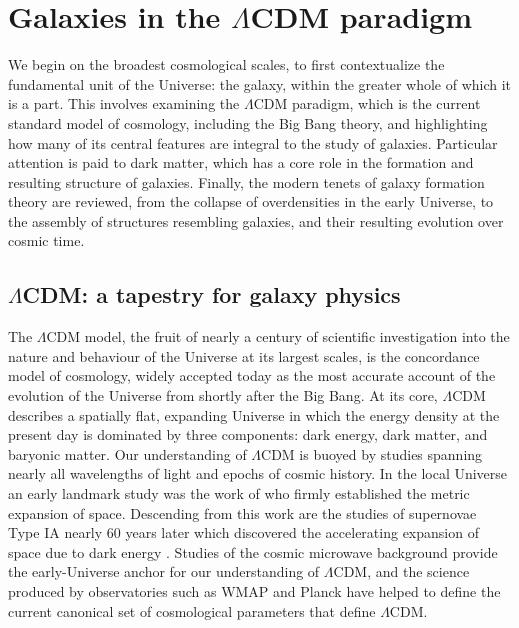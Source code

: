 \section{Galaxies in the \texorpdfstring{$\Lambda$CDM}{LambdaCDM} paradigm}

We begin on the broadest cosmological scales, to first contextualize the fundamental unit of the Universe: the galaxy, within the greater whole of which it is a part. This involves examining the $\Lambda$CDM paradigm, which is the current standard model of cosmology, including the Big Bang theory, and highlighting how many of its central features are integral to the study of galaxies. Particular attention is paid to dark matter, which has a core role in the formation and resulting structure of galaxies. Finally, the modern tenets of galaxy formation theory are reviewed, from the collapse of overdensities in the early Universe, to the assembly of structures resembling galaxies, and their resulting evolution over cosmic time.

\subsection{\texorpdfstring{$\Lambda$CDM}{LambdaCDM}: a tapestry for galaxy physics}

The $\Lambda$CDM model, the fruit of nearly a century of scientific investigation into the nature and behaviour of the Universe at its largest scales, is the concordance model of cosmology, widely accepted today as the most accurate account of the evolution of the Universe from shortly after the Big Bang. At its core, $\Lambda$CDM describes a spatially flat, expanding Universe in which the energy density at the present day is dominated by three components: dark energy, dark matter, and baryonic matter. Our understanding of $\Lambda$CDM is buoyed by studies spanning nearly all wavelengths of light and epochs of cosmic history. In the local Universe an early landmark study was the work of \textcite{hubble29} who firmly established the metric expansion of space. Descending from this work are the studies of supernovae Type IA nearly 60 years later which discovered the accelerating expansion of space due to dark energy \parencite{riess98,perlmutter99}. Studies of the cosmic microwave background provide the early-Universe anchor for our understanding of $\Lambda$CDM, and the science produced by observatories such as WMAP and Planck have helped to define the current canonical set of cosmological parameters that define $\Lambda$CDM.

